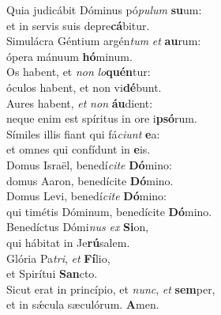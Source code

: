 \evenverse Quia judicábit Dóminus pó\textit{pu}\textit{lum} \textbf{su}um:~\*\\
\evenverse et in servis suis depre\textbf{cá}bitur.\\
\oddverse Simulácra Géntium argén\textit{tum} \textit{et} \textbf{au}rum:~\*\\
\oddverse ópera mánuum \textbf{hó}minum.\\
\evenverse Os habent, et \textit{non} \textit{lo}\textbf{quén}tur:~\*\\
\evenverse óculos habent, et non vi\textbf{dé}bunt.\\
\oddverse Aures habent, \textit{et} \textit{non} \textbf{áu}dient:~\*\\
\oddverse neque enim est spíritus in ore i\textbf{psó}rum.\\
\evenverse Símiles illis fiant qui fá\textit{ci}\textit{unt} \textbf{e}a:~\*\\
\evenverse et omnes qui confídunt in \textbf{e}is.\\
\oddverse Domus Israël, benedí\textit{ci}\textit{te} \textbf{Dó}mino:~\*\\
\oddverse domus Aaron, benedícite \textbf{Dó}mino.\\
\evenverse Domus Levi, benedí\textit{ci}\textit{te} \textbf{Dó}mino:~\*\\
\evenverse qui timétis Dóminum, benedícite \textbf{Dó}mino.\\
\oddverse Benedíctus Dómi\textit{nus} \textit{ex} \textbf{Si}on,~\*\\
\oddverse qui hábitat in Je\textbf{rú}salem.\\
\evenverse Glória Pa\textit{tri}, \textit{et} \textbf{Fí}lio,~\*\\
\evenverse et Spirítui \textbf{San}cto.\\
\oddverse Sicut erat in princípio, et \textit{nunc}, \textit{et} \textbf{sem}per,~\*\\
\oddverse et in sǽcula sæculórum. \textbf{A}men.\\
